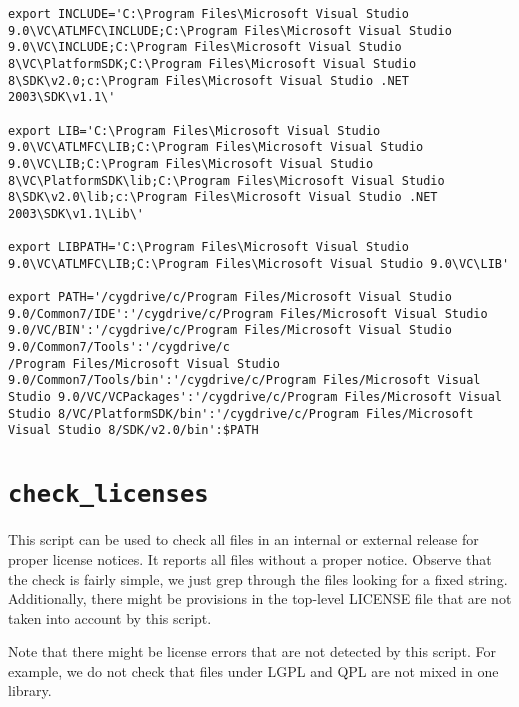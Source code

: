 \begin{verbatim}
export INCLUDE='C:\Program Files\Microsoft Visual Studio 9.0\VC\ATLMFC\INCLUDE;C:\Program Files\Microsoft Visual Studio 9.0\VC\INCLUDE;C:\Program Files\Microsoft Visual Studio 8\VC\PlatformSDK;C:\Program Files\Microsoft Visual Studio 8\SDK\v2.0;c:\Program Files\Microsoft Visual Studio .NET 2003\SDK\v1.1\'

export LIB='C:\Program Files\Microsoft Visual Studio 9.0\VC\ATLMFC\LIB;C:\Program Files\Microsoft Visual Studio 9.0\VC\LIB;C:\Program Files\Microsoft Visual Studio 8\VC\PlatformSDK\lib;C:\Program Files\Microsoft Visual Studio 8\SDK\v2.0\lib;c:\Program Files\Microsoft Visual Studio .NET 2003\SDK\v1.1\Lib\'

export LIBPATH='C:\Program Files\Microsoft Visual Studio 9.0\VC\ATLMFC\LIB;C:\Program Files\Microsoft Visual Studio 9.0\VC\LIB'

export PATH='/cygdrive/c/Program Files/Microsoft Visual Studio 9.0/Common7/IDE':'/cygdrive/c/Program Files/Microsoft Visual Studio 9.0/VC/BIN':'/cygdrive/c/Program Files/Microsoft Visual Studio 9.0/Common7/Tools':'/cygdrive/c
/Program Files/Microsoft Visual Studio 9.0/Common7/Tools/bin':'/cygdrive/c/Program Files/Microsoft Visual Studio 9.0/VC/VCPackages':'/cygdrive/c/Program Files/Microsoft Visual Studio 8/VC/PlatformSDK/bin':'/cygdrive/c/Program Files/Microsoft Visual Studio 8/SDK/v2.0/bin':$PATH

\end{verbatim}


\section{{\tt check\_licenses}}
\label{sec:check_licenses}

This script can be used to check all files in an internal or external release
for proper license notices. It reports all files without a proper notice.
Observe that the check is fairly simple, we just grep through the files
looking for a fixed string. Additionally, there might be provisions in the
top-level LICENSE file that are not taken into account by this script.

Note that there might be license errors that are not detected by this script.
For example, we do not check that files under LGPL and QPL are not mixed in
one library.

